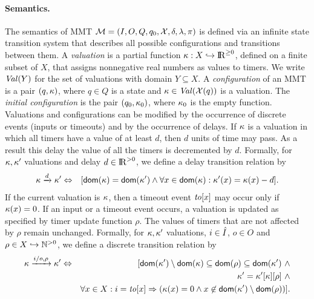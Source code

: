 \paragraph{Semantics.}
The semantics of MMT ${\cal M} = (I, O, Q, q_0, \mathcal{X}, \delta, \lambda, \pi)$ is defined via an infinite state transition system that describes all possible
configurations and transitions between them.
A \emph{valuation} is a partial function
$\kappa : X \hookrightarrow {\rm I\!R}^{\geq 0}$, defined on a finite subset of $X$, that assigns nonnegative real numbers as values to timers.
We write $\mathit{Val}({Y})$ for the set of valuations with domain $Y \subseteq X$.
A \emph{configuration} of an MMT is a pair $(q,\kappa)$, where $q \in Q$ is a state and $\kappa\in\mathit{Val}({\mathcal{X}(q)})$ is a valuation.
The \emph{initial configuration} is the pair $(q_0, \kappa_0)$, where $\kappa_0$ is the empty function.
Valuations and configurations can be modified by the occurrence of discrete events (inputs or timeouts) and by
the occurrence of delays.
If $\kappa$ is a valuation in which all timers
have a value of at least $d$, then $d$ units of time may pass. As a result this delay the value of all the timers is decremented by $d$.
Formally, for $\kappa, \kappa'$ valuations and delay $d \in {\rm I\!R}^{> 0}$, we define a delay transition relation by
\begin{eqnarray*}
\kappa \xrightarrow{d} \kappa' & \Leftrightarrow & [{\textsf{dom}}(\kappa) = {\textsf{dom}}(\kappa') \wedge \forall x \in{\textsf{dom}}(\kappa) : \kappa'(x) = \kappa(x) - d ].
\end{eqnarray*}
If the current valuation is $\kappa$, then a timeout event $\mathit{to}[x]$ may occur only if $\kappa(x)=0$.
If an input or a timeout event occurs, a valuation is updated as specified by timer update function $\rho$.
The values of timers that are not affected by $\rho$ remain unchanged.
Formally, for $\kappa, \kappa'$ valuations, $i \in \hat{I}$, $o \in O$ and $\rho \in X \hookrightarrow {\mathbb N}^{>0}$,
we define a discrete transition relation by
\begin{eqnarray*}
\kappa \xrightarrow{i/o, \rho}  \kappa' & \Leftrightarrow & [ {\textsf{dom}}(\kappa') \setminus {\textsf{dom}}(\kappa)  \subseteq {\textsf{dom}}(\rho) \subseteq {\textsf{dom}}(\kappa') ~ \wedge\\
&& \kappa' =  \kappa'[\kappa][\rho] ~ \wedge \\
&& \forall x \in X : i=\mathit{to}[x] \Rightarrow (\kappa(x) = 0 \wedge x \not\in{\textsf{dom}}(\kappa') \setminus {\textsf{dom}}(\rho))].
\end{eqnarray*}

